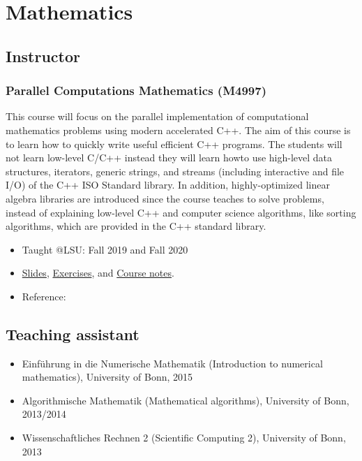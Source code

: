 \documentclass[11pt,a4paper]{article}
\begin{document}
\section*{Mathematics}

\subsection*{Instructor}

\subsubsection*{Parallel Computations Mathematics (M4997)}
This course will focus on the parallel implementation of computational mathematics problems using modern accelerated C++. The aim of this course is to learn how to quickly write useful efficient C++ programs. The students will not learn low-level C/C++ instead they will learn howto use high-level data structures, iterators, generic strings, and streams (including interactive and file I/O) of the C++ ISO Standard library. In addition, highly-optimized linear algebra libraries are introduced since the course teaches to solve problems, instead of explaining low-level C++ and computer science algorithms, like sorting algorithms, which are provided in the C++ standard library.
\begin{itemize}
\item Taught @LSU: Fall 2019 and Fall 2020
\item \href{https://github.com/diehlpkteaching/ParallelComputationMath}{Slides}, \href{https://github.com/diehlpkteaching/ParallelComputationMathExercise}{Exercises}, and \href{https://github.com/diehlpkteaching/ParallelComputationMathScript}{Course notes}.
\item Reference:~\cite{diehl2020gateways}
\end{itemize}

\subsection*{Teaching assistant}
\begin{itemize}
\item Einf\"uhrung in die Numerische Mathematik (Introduction to numerical mathematics), University of Bonn, 2015
\item Algorithmische Mathematik (Mathematical algorithms), University of Bonn, 2013/2014
\item Wissenschaftliches Rechnen 2 (Scientific Computing 2),  University of Bonn, 2013 
\end{itemize}
\end{document}
